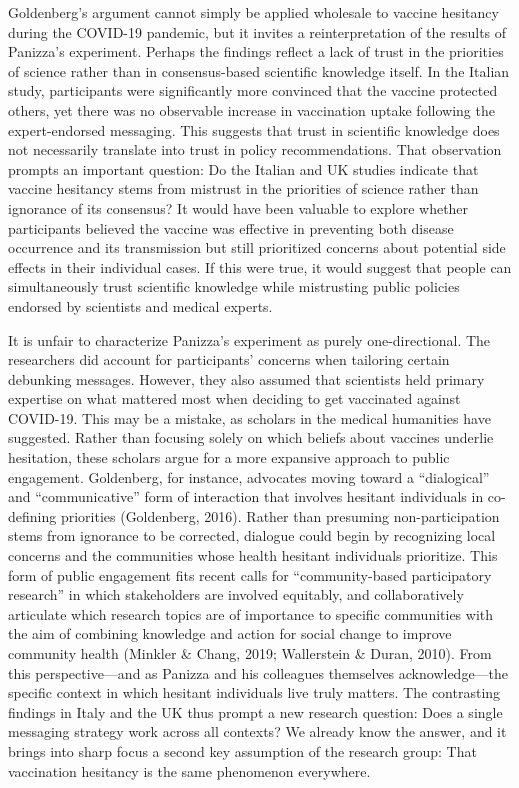\documentclass[authordate, reflection]{jote-new-article}
\begin{document}
	Goldenberg's argument cannot simply be applied wholesale to vaccine hesitancy during the COVID-19 pandemic, but it invites a reinterpretation of the results of Panizza's experiment. Perhaps the findings reflect a lack of trust in the priorities of science rather than in consensus-based scientific knowledge itself. In the Italian study, participants were significantly more convinced that the vaccine protected others, yet there was no observable increase in vaccination uptake following the expert-endorsed messaging. This suggests that trust in scientific knowledge does not necessarily translate into trust in policy recommendations. That observation prompts an important question: Do the Italian and UK studies indicate that vaccine hesitancy stems from mistrust in the priorities of science rather than ignorance of its consensus? It would have been valuable to explore whether participants believed the vaccine was effective in preventing both disease occurrence and its transmission but still prioritized concerns about potential side effects in their individual cases. If this were true, it would suggest that people can simultaneously trust scientific knowledge while mistrusting public policies endorsed by scientists and medical experts.







	It is unfair to characterize Panizza's experiment as purely one-directional. The researchers did account for participants' concerns when tailoring certain debunking messages. However, they also assumed that scientists held primary expertise on what mattered most when deciding to get vaccinated against COVID-19. This may be a mistake, as scholars in the medical humanities have suggested. Rather than focusing solely on which beliefs about vaccines underlie hesitation, these scholars argue for a more expansive approach to public engagement. Goldenberg, for instance, advocates moving toward a “dialogical” and “communicative” form of interaction that involves hesitant individuals in co-defining priorities (Goldenberg, 2016). Rather than presuming non-participation stems from ignorance to be corrected, dialogue could begin by recognizing local concerns and the communities whose health hesitant individuals prioritize. This form of public engagement fits recent calls for “community-based participatory research” in which stakeholders are involved equitably, and collaboratively articulate which research topics are of importance to specific communities with the aim of combining knowledge and action for social change to improve community health (Minkler \& Chang, 2019; Wallerstein \& Duran, 2010). From this perspective—and as Panizza and his colleagues themselves acknowledge—the specific context in which hesitant individuals live truly matters. The contrasting findings in Italy and the UK thus prompt a new research question: Does a single messaging strategy work across all contexts? We already know the answer, and it brings into sharp focus a second key assumption of the research group: That vaccination hesitancy is the same phenomenon everywhere.
\end{document}
